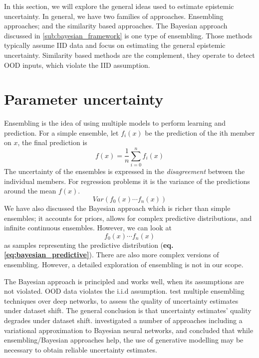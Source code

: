 \documentclass[../main.tex]{subfiles}
\begin{document}


In this section, we will explore the general ideas used to estimate epistemic uncertainty. In general, we have two families of approaches. Ensembling approaches; and the similarity based approaches. The Bayesian approach discussed in  \ref{sub:bayesian_framework} is one type of ensembling. Those methods typically assume IID data and focus on estimating the general epistemic uncertainty. 
Similarity based methods are the complement, they operate to detect OOD inputs, which violate the IID assumption.  

\section{Parameter uncertainty}

Ensembling is the idea of using multiple models to perform learning and prediction. 
For a simple ensemble, let $f_i(x)$ be the prediction of the ith member on $x$, the final prediction is  $$f(x) = \frac{1}{n} \sum_{i=0}^n f_i(x)$$ The uncertainty of the ensembles is expressed in the \emph{disagreement} between the individual members. For regression problems it is the variance of the predictions around the mean $f(x)$. 
$$Var(f_0(x) \cdots f_n(x))$$
We have also discussed the Bayesian approach which is richer than simple ensembles; it accounts for priors, allows for complex predictive distributions, and infinite continuous ensembles. However, we can look at $${f_0(x) \cdots f_n(x)}$$ as samples representing the predictive distribution (\textbf{eq.\ref{eq:bayesian_predictive}}).
There are also more complex versions of ensembling. However, a detailed exploration of ensembling is not in our scope. 

The Bayesian approach is principled and works well, when its assumptions are not violated. OOD data violates the i.i.d assumption. \citet{ovadia2019can} test multiple ensembling techniques over deep networks, to assess the quality of uncertainty estimates under dataset shift. The general conclusion is that uncertainty estimates' quality degrades under dataset shift. \citet{Mundt2019open} investigated a number of approaches including a variational approximation to Bayesian neural networks, and concluded that while ensembling/Bayesian approaches help, the use of generative modelling may be necessary to obtain reliable uncertainty estimates.
\end{document}

